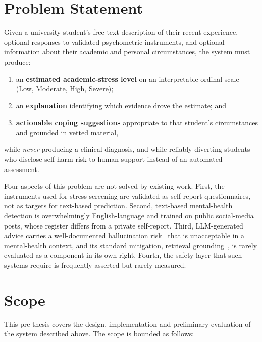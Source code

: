 \section{Problem Statement}
Given a university student's free-text description of their recent experience, optional responses to validated psychometric instruments, and optional information about their academic and personal circumstances, the system must produce:

\begin{enumerate}
	\item an \textbf{estimated academic-stress level} on an interpretable ordinal scale (Low, Moderate, High, Severe);
	\item an \textbf{explanation} identifying which evidence drove the estimate; and
	\item \textbf{actionable coping suggestions} appropriate to that student's circumstances and grounded in vetted material,
\end{enumerate}

\noindent while \textit{never} producing a clinical diagnosis, and while reliably diverting students who disclose self-harm risk to human support instead of an automated assessment.

Four aspects of this problem are not solved by existing work. First, the instruments used for stress screening are validated as self-report questionnaires, not as targets for text-based prediction. Second, text-based mental-health detection is overwhelmingly English-language and trained on public social-media posts, whose register differs from a private self-report. Third, LLM-generated advice carries a well-documented hallucination risk~\cite{ji2023hallucination} that is unacceptable in a mental-health context, and its standard mitigation, retrieval grounding~\cite{lewis2020rag}, is rarely evaluated as a component in its own right. Fourth, the safety layer that such systems require is frequently asserted but rarely measured.

\section{Scope}
This pre-thesis covers the design, implementation and preliminary evaluation of the system described above. The scope is bounded as follows:

